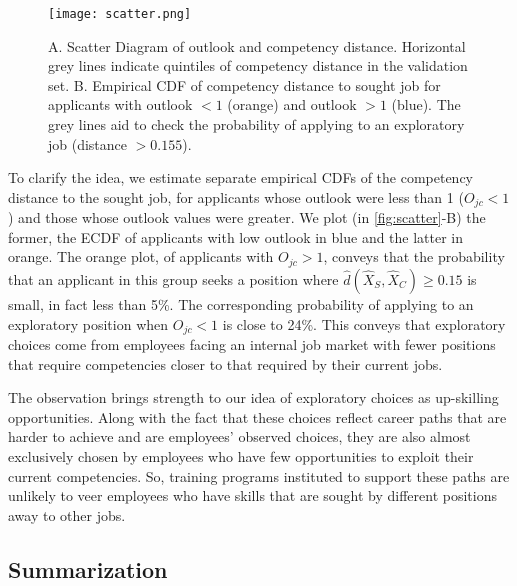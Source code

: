 \documentclass{article}
\begin{document}
\begin{figure}[!ht]
    \centering
    \texttt{[image: scatter.png]} %
    \caption{A. Scatter Diagram of outlook and competency distance. Horizontal grey lines indicate quintiles of competency distance in the validation set. B. Empirical CDF of competency distance to sought job for applicants with outlook $< 1$ (orange) and outlook $ > 1$ (blue). The grey lines aid to check the probability of applying to an exploratory job (distance $ > 0.155$).} %
    \label{fig:scatter} 
\end{figure}


To clarify the idea, we estimate separate empirical CDFs of the competency distance to the sought job, for applicants whose outlook were less than 1 (\(O_{jc} < 1\)) and those whose outlook values were greater. We plot (in \autoref{fig:scatter}-B) the former, the ECDF of applicants with low outlook in blue and the latter in orange. The orange plot, of applicants with \(O_{jc} > 1\), conveys that the probability that an applicant in this group seeks a position where \(\hat{d}(\hat{X}_S, \hat{X}_C) \geq 0.15\) is small, in fact less than 5\%. The corresponding probability of applying to an exploratory position when \(O_{jc} < 1\) is close to 24\%. This conveys that exploratory choices come from employees facing an internal job market with fewer positions that require competencies closer to that required by their current jobs.

The observation brings strength to our idea of exploratory choices as up-skilling opportunities. Along with the fact that these choices reflect career paths that are harder to achieve and are employees’ observed choices, they are also almost exclusively chosen by employees who have few opportunities to exploit their current competencies. So, training programs instituted to support these paths are unlikely to veer employees who have skills that are sought by different positions away to other jobs.


\subsection*{Summarization}
\end{document}
